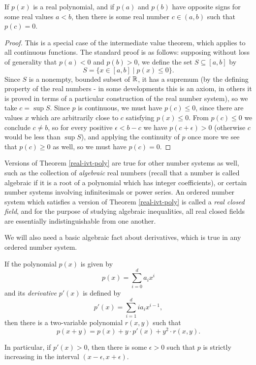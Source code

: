 \begin{thm}\label{real-ivt-poly} If $p(x)$ is a real polynomial, and if $p(a)$ and $p(b)$ have opposite signs for some real values $a < b$, then there is some real number $c \in (a,b)$ such that $p(c) = 0$.
\end{thm}
\begin{proof} This is a special case of the intermediate value theorem, which applies to all continuous functions. The standard proof is as follows: supposing without loss of generality that $p(a) < 0$ and $p(b) > 0$, we define the set $S \subseteq [a,b]$ by
\[
S = \{x \in [a,b] \mid p(x) \le 0\}.
\]
Since $S$ is a nonempty, bounded subset of $\mathbb{R}$, it has a supremum (by the defining property of the real numbers - in some developments this is an axiom, in others it is proved in terms of a particular construction of the real number system), so we take $c = \sup S$. Since $p$ is continuous, we must have $p(c) \le 0$, since there are values $x$ which are arbitrarily close to $c$ satisfying $p(x) \le 0$. From $p(c) \le 0$ we conclude $c \ne b$, so for every positive $\epsilon < b-c$ we have $p(c+\epsilon) > 0$ (otherwise $c$ would be less than $\sup S$), and applying the continuity of $p$ once more we see that $p(c) \ge 0$ as well, so we must have $p(c) = 0$.
\end{proof}

Versions of Theorem \ref{real-ivt-poly} are true for other number systems as well, such as the collection of \emph{algebraic} real numbers (recall that a number is called algebraic if it is a root of a polynomial which has integer coefficients), or certain number systems involving infinitesimals or power series. An ordered number system which satisfies a version of Theorem \ref{real-ivt-poly} is called a \emph{real closed field}, and for the purpose of studying algebraic inequalities, all real closed fields are essentially indistinguishable from one another.

We will also need a basic algebraic fact about derivatives, which is true in any ordered number system.

\begin{prop} If the polynomial $p(x)$ is given by
\[
p(x) = \sum_{i=0}^d a_i x^i
\]
and its \emph{derivative} $p'(x)$ is defined by
\[
p'(x) = \sum_{i=1}^{d} ia_i x^{i-1},
\]
then there is a two-variable polynomial $r(x,y)$ such that
\[
p(x + y) = p(x) + y\cdot p'(x) + y^2\cdot r(x,y).
\]

In particular, if $p'(x) > 0$, then there is some $\epsilon > 0$ such that $p$ is strictly increasing in the interval $(x-\epsilon, x+\epsilon)$.
\end{prop}

